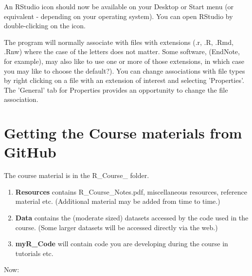 \documentclass[titlepage]{book}\usepackage{knitr}
\begin{document}
An RStudio icon should now be available on your Desktop or Start menu (or equivalent - depending on your operating system). You can open RStudio by double-clicking on the icon.

The program will normally associate with files with extensions (.r, .R, .Rmd, .Rnw) where the case of the letters does not matter. Some software, (EndNote, for example), may also like to use one or more of those extensions, in which case you may like to choose the default?). You can change associations with file types by right clicking on a file with an extension of interest and selecting 'Properties'. The 'General' tab for Properties provides an opportunity to change the file association.

\section*{Getting the Course materials from GitHub}

The course material is in the R\_Course\_ folder. 


\begin{enumerate}
\item{\textbf{Resources} contains R\_Course\_Notes.pdf, miscellaneous resources, reference material etc. (Additional material may be added from time to time.)}\label{ResourcesFolder}
\item{\textbf{Data} contains the (moderate sized) datasets accessed by the code used in the course. (Some larger datasets will be accessed directly via the web.)}\label{DataFolder}
\item{\textbf{myR\_Code} will contain code you are developing during the course in tutorials etc.}\label{myCodeFolder}
\end{enumerate}

Now: 
\end{document}
